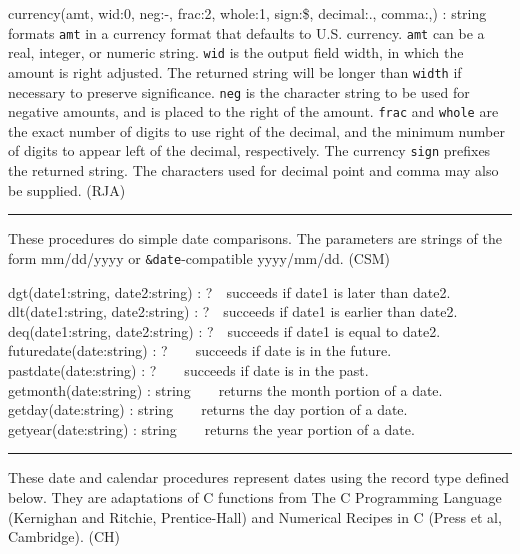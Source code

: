 \textsf{currency(amt, wid:0, neg:{\textquotedbl}-{\textquotedbl},
frac:2, whole:1, sign:{\textquotedbl}\${\textquotedbl},
decimal:{\textquotedbl}.{\textquotedbl},
comma:{\textquotedbl},{\textquotedbl}) : string} formats \texttt{amt}
in a currency format that defaults to U.S. currency. \texttt{amt} can
be a real, integer, or numeric string. \texttt{wid} is the output field
width, in which the amount is right adjusted. The returned string will
be longer than \texttt{width} if necessary to preserve significance.
\texttt{neg} is the character string to be used for negative amounts,
and is placed to the right of the amount. \texttt{frac} and
\texttt{whole} are the exact number of digits to use right of the
decimal, and the minimum number of digits to appear left of the
decimal, respectively. The currency \texttt{sign} prefixes the returned
string. The characters used for decimal point and comma may also be
supplied. (RJA)

\vspace{0.25cm}\hrule{}

These procedures do simple date comparisons. The
parameters are strings of the form mm/dd/yyyy or
\texttt{\&date}{}-compatible yyyy/mm/dd. (CSM)

dgt(date1:string, date2:string) : ?\ \ succeeds if date1 is later than
date2.\\
dlt(date1:string, date2:string) : ?\ \ succeeds if date1 is earlier than
date2.\\
deq(date1:string, date2:string) : ?\ \ succeeds if date1 is equal to
date2.\\
futuredate(date:string) : ?\ \ \ \ succeeds if date is in the
future.\\
pastdate(date:string) : ?\ \ \ \ succeeds if date is in the
past.\\
getmonth(date:string) : string\ \ \ \ returns the month portion of a
date.\\
getday(date:string) : string\ \ \ \ returns the day portion of a
date.\\
getyear(date:string) : string\ \ \ \ returns the year portion of a date.

\vspace{0.25cm}\hrule{}

These date and calendar procedures represent dates using the record type
defined below. They are adaptations of C functions from
{\textquotedbl}The C Programming Language{\textquotedbl} (Kernighan and
Ritchie, Prentice-Hall) and {\textquotedbl}Numerical Recipes in
C{\textquotedbl} (Press et al, Cambridge). (CH)

